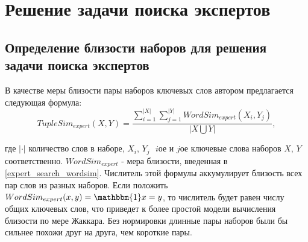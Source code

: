 \section{Решение задачи поиска экспертов} \label{expert_search_tuplesim}
\subsection{Определение близости наборов для решения задачи поиска экспертов}
В качестве меры близости пары наборов ключевых слов автором предлагается следующая формула:
$$ TupleSim_{expert}(X,Y) = \frac{\sum_{i=1}^{|X|}\sum_{j=1}^{|Y|}WordSim_{expert}(X_i, Y_j)}{|X \bigcup Y|}, $$

где $|\cdot|$ ­ количество слов в наборе, $X_i$, $Y_j$ ­ $i$­ое и $j$­ое ключевые слова наборов $X$, $Y$ соответственно. $WordSim_{expert}$ - мера близости, введенная в \ref{expert_search_wordsim}. Числитель этой формулы аккумулирует близость всех пар слов из разных наборов. Если положить $WordSim_{expert}(x, y) = \mathbbm{1}x=y$, то числитель будет равен числу общих ключевых слов, что приведет к более простой модели вычисления близости по мере Жаккара. Без нормировки длинные пары наборов были бы сильнее похожи друг на друга, чем короткие пары.


